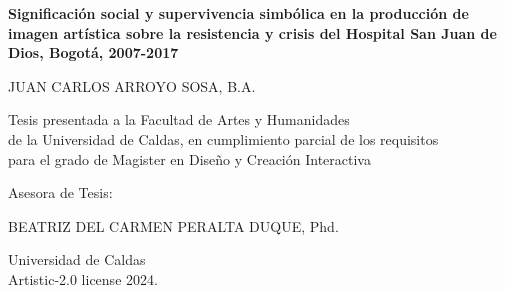 \begin{titlepage}
\renewcommand*{\thepage}{Title}

    \begin{center} 
        \vspace*{3cm}
        
        {\fontsize{16pt}{22pt}\selectfont\textbf
            {Significación social y supervivencia simbólica en la producción de imagen artística sobre la resistencia y crisis del Hospital San Juan de Dios, Bogotá, 2007-2017}
        }


        
        \vspace{1.5cm}
        
        
        \vspace{0.5cm}
        
        	JUAN CARLOS ARROYO SOSA, B.A. \\

        \vspace{1.5cm}
        
        	Tesis presentada a la Facultad de Artes y Humanidades \\
            de la Universidad de Caldas, en cumplimiento parcial de los requisitos \\
            para el grado de Magister en Diseño y Creación Interactiva

        
        \vspace{2.5cm}
        
        Asesora de Tesis:\\

        \vspace{0.5cm}
        
        BEATRIZ DEL CARMEN PERALTA DUQUE, Phd.\\
        
        \vspace{3cm}
        
            Universidad de Caldas\\
            \vspace{0.5cm}
            Artistic-2.0 license 2024. 
    
    \end{center}

\end{titlepage}